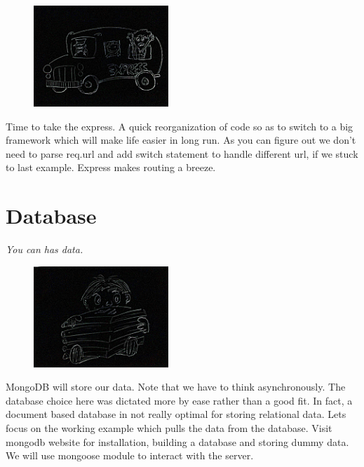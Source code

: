 \documentclass[12pt]{book}
\begin{document}
\begin{figure}
\begin{center}\includegraphics[width=2in]{org/art/fasterEasier.png}\end{center}
\end{figure}

Time to take the express. A quick reorganization of code so as to switch to a big framework which will make life easier in long run. As you can figure out we don't need to parse req.url and add switch statement to handle different url, if we stuck to last example. Express makes routing a breeze.

\vspace{0.6cm}\vspace{0.6cm}



\chapter{Database}
\begin{flushright}\textit{You can has data.}\end{flushright}

\begin{figure}
\begin{center}\includegraphics[width=2in]{org/art/dataStorage.png}\end{center}
\end{figure}

MongoDB will store our data. Note that we have to think asynchronously. The database choice here was dictated more by ease rather than a good fit. In fact, a document based database in not really optimal for storing relational data.
Lets focus on the working example which pulls the data from the database. Visit mongodb website for installation, building a database and storing dummy data. We will use mongoose module to interact with the server.
\end{document}
